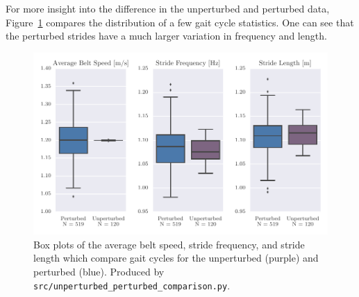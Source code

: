 \documentclass[fleqn,10pt]{wlpeerj}
\begin{document}
For more insight into the difference in the unperturbed and perturbed data,
Figure~\ref{fig:gait-cycle-stats-comparison} compares the distribution of a few
gait cycle statistics. One can see that the perturbed strides have a much
larger variation in frequency and length.
%
\begin{figure}
  \centering
  \includegraphics{figures/unperturbed-perturbed-boxplot-comparison.pdf}
  \cprotect\caption{Box plots of the average belt speed, stride frequency, and
    stride length which compare gait cycles for the unperturbed (purple) and
    perturbed (blue). Produced by \verb|src/unperturbed_perturbed_comparison.py|.}
  \label{fig:gait-cycle-stats-comparison}
\end{figure}
\end{document}
